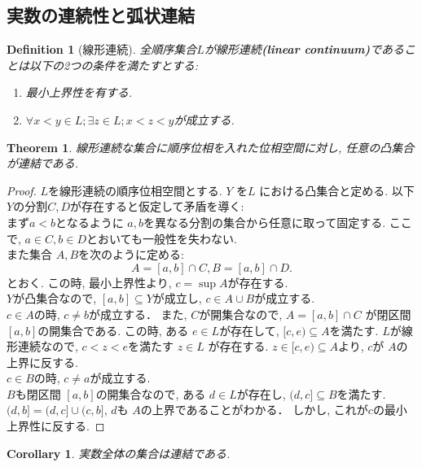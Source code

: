 \documentclass[dvipdfmx]{jbook}
\newtheorem{theorem}{Theorem}[section]
\newtheorem{corollary}{Corollary}[theorem]
\newtheorem{definition}{Definition}[section]
\theoremstyle{remark}
\theoremstyle{plain}
\begin{document}
\subsection{実数の連続性と弧状連結}

\begin{definition}[線形連続]
	全順序集合$L$が線形連続\textbf{(linear continuum)}であることは以下の2つの条件を満たすとする:
	\begin{enumerate}
		\item 最小上界性を有する.
		\item $\forall x< y \in L ; \exists z \in L; x<z<y$が成立する.
	\end{enumerate}
\end{definition}

\begin{theorem}
	線形連続な集合に順序位相を入れた位相空間に対し, 任意の凸集合が連結である.
\end{theorem}

\begin{proof}
	$L$を線形連続の順序位相空間とする. 
	$Y$ を$L$ における凸集合と定める. 
	以下$Y$の分割$C,D$が存在すると仮定して矛盾を導く:\\ 
	まず$a<b$となるように $a,b$を異なる分割の集合から任意に取って固定する. 
	ここで, $a \in C, b \in D$とおいても一般性を失わない.\\
	また集合 $A,B$を次のように定める:
	 \[
		 A=[a,b] \cap C, B= [a,b] \cap D
	.\] 
	とおく. この時, 最小上界性より, $c=\sup A$が存在する.\\
	$Y$が凸集合なので,  $[a,b] \subseteq Y$が成立し, $ c \in A \cup B$が成立する.\\
	$c\in A$の時,  $c \neq b$が成立する．
	また, $C$が開集合なので, $A=[a,b] \cap C$ が閉区間$[a,b]$の開集合である. 
	この時, ある $e \in L$が存在して,  $[c,e) \subseteq A$を満たす.
	$L$が線形連続なので,  $c<z<e$を満たす $z \in L$ が存在する. 
	$z \in [c,e) \subseteq A$より, $c$が $A$の上界に反する.\\
	 $c \in B$の時,  $c \neq a$が成立する. \\
	 $B$も閉区間 $[a,b]$の開集合なので, ある $d \in L$が存在し,  $(d,c] \subseteq B$を満たす.
	 $(d,b] = (d,c] \cup (c ,b]$, $d$も $A$の上界であることがわかる．
	 しかし, これが$c$の最小上界性に反する.
\end{proof}

\begin{corollary}
	実数全体の集合は連結である.
\end{corollary}
\end{document}
